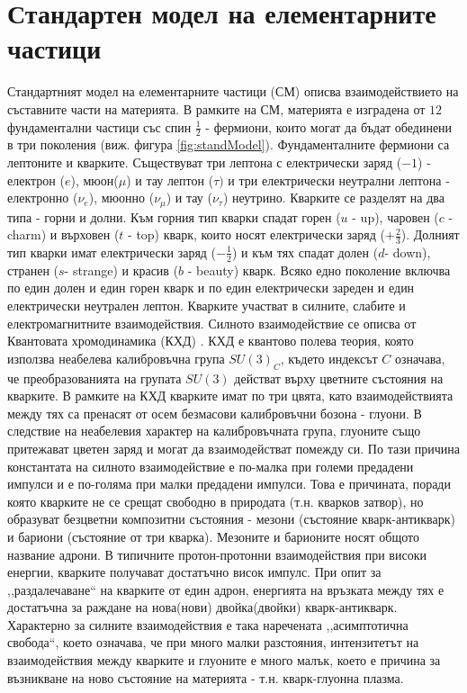\section{Стандартен модел на елементарните частици}
\par Стандартният модел на елементарните частици (СМ) \cite{PDG,Pich} описва взаимодействието на съставните части на материята. В рамките на СМ, материята е изградена от $12$ фундаментални частици със спин $\frac{1}{2}$ - фермиони, които могат да бъдат обединени в три поколения (виж. фигура \ref{fig:standModel}). Фундаменталните фермиони са лептоните и кварките. Съществуват три лептона с електрически заряд ($-1$) - електрон ($e$), мюон($\mu$) и тау лептон ($\tau)$ и три електрически неутрални лептона - електронно ($\nu_e$), мюонно ($\nu_{\mu}$) и тау ($\nu_{\tau}$) неутрино. Кварките се разделят на два типа - горни и долни. Към горния тип кварки спадат горен ($u$ - up), чаровен ($c$ - charm) и върховен ($t$ - top) кварк, които носят електрически заряд ($+\frac{2}{3}$). Долният тип кварки имат електрически заряд ($-\frac{1}{2}$) и към тях спадат долен ($d$- down), странен ($s$- strange) и красив ($b$ - beauty) кварк.  Всяко едно поколение включва по един долен и един горен кварк и по един електрически зареден и един електрически неутрален лептон. Кварките участват в силните, слабите и електромагнитните взаимодействия. Силното взаимодействие се описва от Квантовата хромодинамика (КХД) \cite{gellmann,Politzer}. КХД е квантово полева теория, която използва неабелева калибровъчна група $SU(3)_C$, където индексът $C$ означава, че преобразованията на групата $SU(3)$ действат върху цветните състояния на кварките. В рамките на КХД кварките имат по три цвята, като взаимодействията между тях са пренасят от осем безмасови калибровъчни бозона - глуони. В следствие на неабелевия характер на калибровъчната група, глуоните също притежават цветен заряд и могат да взаимодействат помежду си. По тази причина константата на силното взаимодействие е по-малка при големи предадени импулси и е по-голяма при малки предадени импулси. Това е причината, поради която кварките не се срещат свободно в природата (т.н. кварков затвор), но образуват безцветни композитни състояния - мезони (състояние кварк-антикварк) и бариони (състояние от три кварка). Мезоните и барионите носят общото название адрони. В типичните протон-протонни взаимодействия при високи енергии, кварките получават достатъчно висок импулс. При опит за ,,раздалечаване`` на кварките от един адрон, енергията на връзката между тях е достатъчна за раждане на нова(нови) двойка(двойки) кварк-антикварк. Характерно за силните взаимодействия е така наречената ,,асимптотична свобода``, което означава, че при много малки разстояния, интензитетът на взаимодействия между кварките и глуоните е много малък, което е причина за възникване на ново състояние на материята - т.н. кварк-глуонна плазма.

